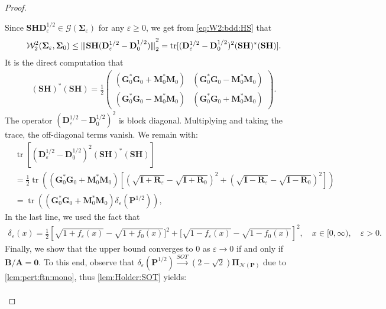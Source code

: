 \documentclass[noinfoline]{imsart}\setcounter{tocdepth}{2}
\newcommand{\m}[1]{\mathbf{#1}}
\renewcommand{\c}[1]{\mathcal{#1}}
\DeclareMathOperator{\tr}{tr}
\newcommand{\vertii}[1]{{\vert\kern-0.25ex\vert\kern-0.25ex\vert #1 
    \vert\kern-0.25ex\vert\kern-0.25ex\vert}} %
\theoremstyle{plain}
\begin{document}
\begin{proof}
\begin{enumerate}[leftmargin = *]
Since $\m{S} \m{H} \m{D}_{\varepsilon}^{1/2} \in \c{G}(\m{\Sigma}_{\varepsilon})$ for any $\varepsilon \ge 0$, we get from \eqref{eq:W2:bdd:HS} that
\begin{align*}
    \c{W}_{2}^{2}(\m{\Sigma}_{\varepsilon}, \m{\Sigma}_{0}) \le \vertii{\m{S} \m{H} (\m{D}_{\varepsilon}^{1/2} -  \m{D}_{0}^{1/2})}_{2}^{2} = \tr [(\m{D}_{\varepsilon}^{1/2} -  \m{D}_{0}^{1/2})^{2} (\m{S} \m{H})^{*} (\m{S} \m{H})].
\end{align*}
It is the direct computation that
\begin{align*}
    (\m{S} \m{H})^{*} (\m{S} \m{H}) = \frac{1}{2} \left(
    \begin{array}{c|c}
        (\m{G}_{0}^{*} \m{G}_{0} + \m{M}_{0}^{*} \m{M}_{0}) & (\m{G}_{0}^{*} \m{G}_{0} - \m{M}_{0}^{*} \m{M}_{0}) \\
        \hline
        (\m{G}_{0}^{*} \m{G}_{0} - \m{M}_{0}^{*} \m{M}_{0}) & (\m{G}_{0}^{*} \m{G}_{0} + \m{M}_{0}^{*} \m{M}_{0})
    \end{array}
    \right).
\end{align*}
The operator $(\m{D}_{\varepsilon}^{1/2} - \m{D}_{0}^{1/2})^{2}$ is block diagonal. Multiplying and taking the trace, the off-diagonal terms vanish. We remain with:
\begin{align*}
    &\tr [(\m{D}_{\varepsilon}^{1/2} -  \m{D}_{0}^{1/2})^{2} (\m{S} \m{H})^{*} (\m{S} \m{H})] \\
    &= \frac{1}{2} \tr \left((\m{G}_{0}^{*} \m{G}_{0} + \m{M}_{0}^{*} \m{M}_{0}) [(\sqrt{\m{I} + \m{R}_{\varepsilon}} - \sqrt{\m{I} + \m{R}_{0}})^{2} + (\sqrt{\m{I} - \m{R}_{\varepsilon}} - \sqrt{\m{I} - \m{R}_{0}})^{2}] \right) \\
    &= \tr \left((\m{G}_{0}^{*} \m{G}_{0} + \m{M}_{0}^{*} \m{M}_{0}) \delta_{\varepsilon}(\m{P}^{1/2}) \right) ,
\end{align*}
In the last line, we used the fact that
\begin{align*}
    \delta_{\varepsilon}(x) = \frac{1}{2} \left[ \sqrt{1+f_{\varepsilon}(x)} - \sqrt{1+f_{0}(x)}]^{2} + [\sqrt{1-f_{\varepsilon}(x)} - \sqrt{1-f_{0}(x)} \right]^{2}, \quad x \in [0, \infty), \quad \varepsilon >0.
\end{align*}
Finally, we show that the upper bound converges to $0$ as $\varepsilon \to 0$ if and only if $\m{B}/\m{A} = \m{0}$. To this end, observe that $\delta_{\varepsilon}(\m{P}^{1/2}) \xrightarrow{SOT} (2-\sqrt{2}) \m{\Pi}_{\c{N}(\m{P})}$ due to \cref{lem:pert:ftn:mono}, thus \cref{lem:Holder:SOT} yields:
\begin{align*}

\end{align*}
\end{enumerate}
\end{proof}
\end{document}

